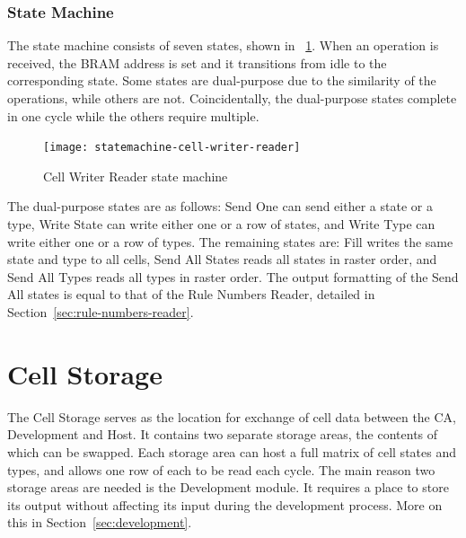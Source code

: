 \subsubsection{State Machine}

The state machine consists of seven states, shown in \figurename~\ref{fig:statemachine-cell-writer-reader}.
When an operation is received, the BRAM address is set and it transitions from idle to the corresponding state.
Some states are dual-purpose due to the similarity of the operations, while others are not.
Coincidentally, the dual-purpose states complete in one cycle while the others require multiple\footnotemark.

\begin{figure}[!ht]
    \centering
    \texttt{[image: statemachine-cell-writer-reader]}
    \caption{Cell Writer Reader state machine}
    \label{fig:statemachine-cell-writer-reader}
\end{figure}

The dual-purpose states are as follows:
Send One can send either a state or a type, Write State can write either one or a row of states, and Write Type can write either one or a row of types.
The remaining states are:
Fill writes the same state and type to all cells, Send All States reads all states in raster order, and Send All Types reads all types in raster order.
The output formatting of the Send All states is equal to that of the Rule Numbers Reader, detailed in Section~\ref{sec:rule-numbers-reader}.


\section{Cell Storage}

The Cell Storage serves as the location for exchange of cell data between the CA, Development and Host.
It contains two separate storage areas, the contents of which can be swapped.
Each storage area can host a full matrix of cell states and types, and allows one row of each to be read each cycle.
The main reason two storage areas are needed is the Development module.
It requires a place to store its output without affecting its input during the development process.
More on this in Section~\ref{sec:development}.

